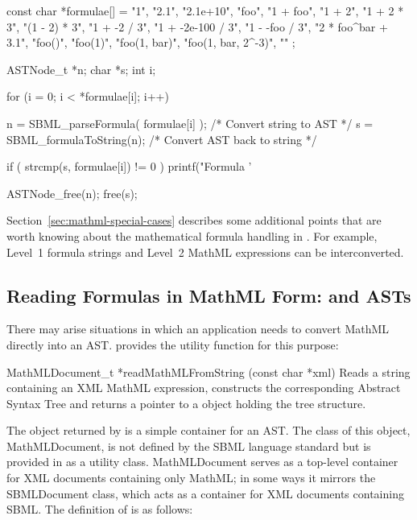 \documentclass{sbmlmanual}
\begin{document}
\begin{example}[c]
  const char *formulae[] =
  {
    "1",
    "2.1",
    "2.1e+10",
    "foo",
    "1 + foo",
    "1 + 2",
    "1 + 2 * 3",
    "(1 - 2) * 3",
    "1 + -2 / 3",
    "1 + -2e-100 / 3",
    "1 - -foo / 3",
    "2 * foo^bar + 3.1",
    "foo()",
    "foo(1)",
    "foo(1, bar)",
    "foo(1, bar, 2^-3)",
    ""
  };
  
  ASTNode_t *n;
  char      *s;
  int        i;
  
  for (i = 0; i < *formulae[i]; i++)
  {
    n = SBML_parseFormula( formulae[i] );  /* Convert string to AST */
    s = SBML_formulaToString(n);           /* Convert AST back to string */
  
    if ( strcmp(s, formulae[i]) != 0 ) 
    {
      printf("Formula '%
    }
  
    ASTNode_free(n);
    free(s);
  }
\end{example}

Section~\ref{sec:mathml-special-cases} describes some additional points
that are worth knowing about the mathematical formula handling in
\libsbml{}.  For example,  Level~1 formula strings and Level~2 MathML
expressions can  be interconverted.


\subsection{Reading Formulas in MathML Form:  and ASTs}
\label{sec:mathml-math}

There may arise situations in which an application needs to convert MathML
directly into an AST.  \libsbml{} provides the utility function
 for this purpose:

\begin{methoddef}{MathMLDocument\_t *readMathMLFromString (const char *xml)}
  Reads a string containing an XML MathML expression, constructs the
  corresponding Abstract Syntax Tree and returns a pointer to a
   object holding the tree structure.
\end{methoddef}

The object returned by  is a simple
container for an AST.  The class of this object, MathMLDocument, is not
defined by the SBML language standard but is provided in \libsbml{} as a
utility class.  MathMLDocument serves as a top-level container for XML
documents containing only MathML; in some ways it mirrors the SBMLDocument
class, which acts as a container for XML documents containing SBML.  The
definition of  is as follows:
 
\end{document}
